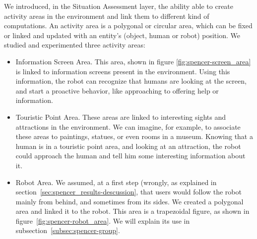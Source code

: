 We introduced, in the Situation Assessment layer, the ability able to create activity areas in the environment and link them to different kind of computations. An activity area is a polygonal or circular area, which can be fixed or linked and updated with an entity's (object, human or robot) position. We studied and experimented three activity areas:

\begin{itemize}
\item Information Screen Area. This area, shown in figure \ref{fig:spencer-screen_area} is linked to information screens present in the environment. Using this information, the robot can recognize that humans are looking at the screen, and  start a proactive behavior, like approaching to offering help or information.
\item Touristic Point Area. These areas are linked to interesting sights and attractions in the environment. We can imagine, for example, to associate these areas to paintings, statues, or even rooms in a museum. Knowing that a human is in a touristic point area, and looking at an attraction, the robot could approach the human and tell him some interesting information about it.
\item Robot Area. We assumed, at a first step (wrongly, as explained in section~\ref{sec:spencer_results-descussion}, that users would follow the robot mainly from behind, and sometimes from its sides. We created a polygonal area and linked it to the robot. This area is a trapezoidal figure, as shown in figure~\ref{fig:spencer-robot_area}. We will explain its use in subsection~\ref{subsec:spencer-group}.
\end{itemize}

